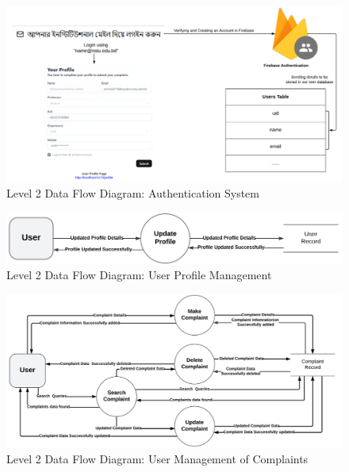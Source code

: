 \documentclass[a4paper,12pt]{article}
\begin{document}
\begin{figure}[H]
    \centering
    \includegraphics[width=1\linewidth]{photos/dfd-2-auth.png}
    \caption{Level 2 Data Flow Diagram: Authentication System }
    \label{fig:enter-label}
\end{figure}

\begin{figure}[H]
    \centering
    \includegraphics[width=1\linewidth]{photos/dfd-2-update-profile.png}
    \caption{Level 2 Data Flow Diagram: User Profile Management }
    \label{fig:enter-label}
\end{figure}

\begin{figure}[H]
    \centering
    \includegraphics[width=1\linewidth]{photos/dfd-2-complaint.png}
    \caption{Level 2 Data Flow Diagram: User Management of Complaints }
    \label{fig:enter-label}
\end{figure}
\end{document}
